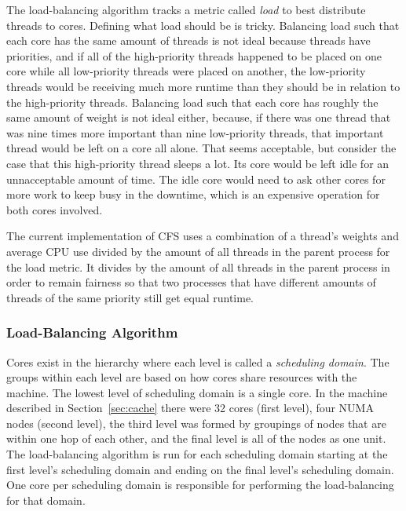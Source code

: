 \documentclass{sig-alternate}
\begin{document}
The load-balancing algorithm tracks a metric called \emph{load} to best distribute threads to cores. Defining what load should be is tricky. Balancing load such that each core has the same amount of threads is not ideal because threads have priorities, and if all of the high-priority threads happened to be placed on one core while all low-priority threads were placed on another, the low-priority threads would be receiving much more runtime than they should be in relation to the high-priority threads. Balancing load such that each core has roughly the same amount of weight is not ideal either, because, if there was one thread that was nine times more important than nine low-priority threads, that important thread would be left on a core all alone. That seems acceptable, but consider the case that this high-priority thread sleeps a lot. Its core would be left idle for an unnacceptable amount of time. The idle core would need to ask other cores for more work to keep busy in the downtime, which is an expensive operation for both cores involved.~\cite{Lozi:2016}

The current implementation of CFS uses a combination of a thread's weights and average CPU use divided by the amount of all threads in the parent process for the load metric. It divides by the amount of all threads in the parent process in order to remain fairness so that two processes that have different amounts of threads of the same priority still get equal runtime.~\cite{Lozi:2016}

\subsubsection{Load-Balancing Algorithm}
\label{sec:loadbalancealg}

Cores exist in the hierarchy where each level is called a \emph{scheduling domain}. The groups within each level are based on how cores share resources with the machine. The lowest level of scheduling domain is a single core. In the machine described in Section~\ref{sec:cache} there were 32 cores (first level), four NUMA nodes (second level), the third level was formed by groupings of nodes that are within one hop of each other, and the final level is all of the nodes as one unit.
The load-balancing algorithm is run for each scheduling domain starting at the first level's scheduling domain and ending on the final level's scheduling domain. One core per scheduling domain is responsible for performing the load-balancing for that domain.
\end{document}
